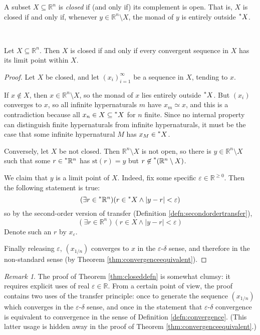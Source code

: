 \documentclass[11pt]{amsart}
\theoremstyle{remark}
\newtheorem*{remark}{Remark}
\newcommand{\st}{\mathrm{st}}
\newcommand{\hyp}[1][\mathbb{R}]{\prescript{*}{}{#1}}
\newcommand{\near}{\simeq}
\begin{document}
\begin{defn} \label{defn:closed}
A subset $X \subseteq \mathbb{R}^n$ is \emph{closed} if (and only if) its complement is open.
That is, $X$ is closed if and only if, whenever $y \in \mathbb{R}^n \setminus X$, the monad of $y$ is entirely outside $\hyp[X]$.
\end{defn}

\

\begin{thm} \label{thm:closeddefn} Let $X \subseteq \mathbb{R}^n$. Then $X$ is closed if and only if every convergent sequence in $X$ has its limit point within $X$. \end{thm}
\begin{proof}
Let $X$ be closed, and let $(x_i)_{i=1}^{\infty}$ be a sequence in $X$, tending to $x$.

If $x \not \in X$, then $x \in \mathbb{R}^n \setminus X$, so the monad of $x$ lies entirely outside $\hyp[X]$.
But $(x_i)$ converges to $x$, so all infinite hypernaturals $m$ have $x_m \near x$, and this is a contradiction because all $x_n \in X \subseteq \hyp[X]$ for $n$ finite.
Since no internal property can distinguish finite hypernaturals from infinite hypernaturals, it must be the case that some infinite hypernatural $M$ has $x_M \in \hyp[X]$.

Conversely, let $X$ be not closed.
Then $\mathbb{R}^n \setminus X$ is not open, so there is $y \in \mathbb{R}^n \setminus X$ such that some $r \in \hyp[\mathbb{R}^n]$ has $\st(r) = y$ but $r \not \in \hyp[(\mathbb{R}^n \setminus X)]$.

We claim that $y$ is a limit point of $X$.
Indeed, fix some specific $\varepsilon \in \mathbb{R}^{\geq 0}$.
Then the following statement is true: $$(\exists r \in \hyp[\mathbb{R}]^n )(r \in \hyp[X] \wedge |y-r| < \varepsilon)$$
so by the second-order version of transfer (Definition \ref{defn:secondordertransfer}), $$(\exists r \in \mathbb{R}^n)(r \in X \wedge |y-r| < \varepsilon)$$
Denote such an $r$ by $x_{\varepsilon}$.

Finally releasing $\varepsilon$, $(x_{1/n})$ converges to $x$ in the $\varepsilon$-$\delta$ sense, and therefore in the non-standard sense (by Theorem \ref{thm:convergenceequivalent}).
\end{proof}

\begin{remark}
The proof of Theorem \ref{thm:closeddefn} is somewhat clumsy: it requires explicit uses of real $\varepsilon \in \mathbb{R}$. From a certain point of view, the proof contains two uses of the transfer principle: once to generate the sequence $(x_{1/n})$ which converges in the $\varepsilon$-$\delta$ sense, and once in the statement that $\varepsilon$-$\delta$ convergence is equivalent to convergence in the sense of Definition \ref{defn:convergence}.
(This latter usage is hidden away in the proof of Theorem \ref{thm:convergenceequivalent}.)
\end{remark}
\end{document}
